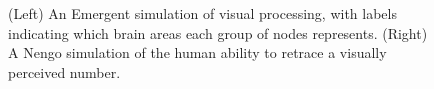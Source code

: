 \begin{figure}[h]
\centering
{}
\hspace*{.4in}
\caption[Left: From \url{https://grey.colorado.edu/emergent/index.php/File:Screenshot_vision.png}; Right: Spaun screenshot. Cf. \cite{eliasmith2012large}.]{(Left) An Emergent simulation of visual processing, with labels indicating which brain areas each group of nodes represents. (Right) A Nengo simulation of the human ability to retrace a visually perceived number.}
\label{ccn}
\end{figure}

